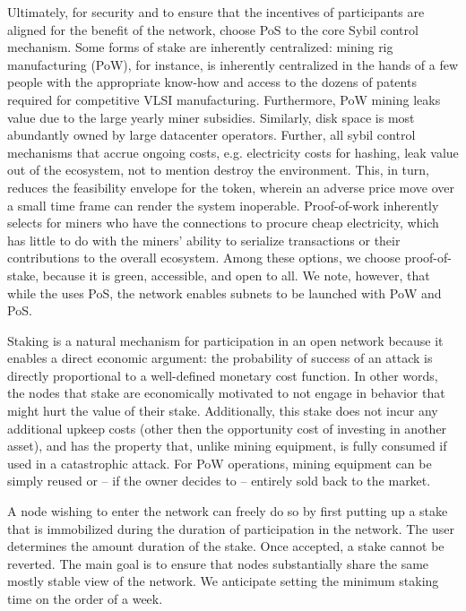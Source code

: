\documentclass[runningheads]{llncs}
\begin{document}
Ultimately, for security and to ensure that the incentives of participants are aligned for the benefit of the network, \AVATokenName{} choose PoS to the core Sybil control mechanism. 
Some forms of stake are inherently centralized: mining rig manufacturing (PoW), for instance, is inherently centralized in the hands of a few people with the appropriate know-how and access to the dozens of patents required for competitive VLSI manufacturing.
Furthermore, PoW mining leaks value due to the large yearly miner subsidies. 
Similarly, disk space is most abundantly owned by large datacenter operators.%
Further, all sybil control mechanisms that accrue ongoing costs, e.g. electricity costs for hashing, leak value out of the ecosystem, not to mention destroy the environment. This, in turn, reduces the feasibility envelope for the token, wherein an adverse price move over a small time frame can render the system inoperable.
Proof-of-work inherently selects for miners who have the connections to procure cheap electricity, which has little to do with the miners' ability to serialize transactions or their contributions to the overall ecosystem.
Among these options, we choose proof-of-stake, because it is green, accessible, and open to all. 
We note, however, that while the \AVATokenName{} uses PoS, the \AVAPlatformName{} network enables subnets to be launched with PoW and PoS.

Staking is a natural mechanism for participation in an open network because it enables a direct economic argument: the probability of success of an attack is directly proportional to a well-defined monetary cost function. In other words, the nodes that stake are economically motivated to not engage in behavior that might hurt the value of their stake. 
Additionally, this stake does not incur any additional upkeep costs (other then the opportunity cost of investing in another asset), and has the property that, unlike mining equipment, is fully consumed if used in a catastrophic attack. For PoW operations, mining equipment can be simply reused or -- if the owner decides to -- entirely sold back to the market.

A node wishing to enter the network can freely do so by first putting up a stake that is immobilized during the duration of participation in the network. The user determines the amount duration of the stake.
Once accepted, a stake cannot be reverted. 
The main goal is to ensure that nodes substantially share the same mostly stable view of the network. 
We anticipate setting the minimum staking time on the order of a week. 
\end{document}
